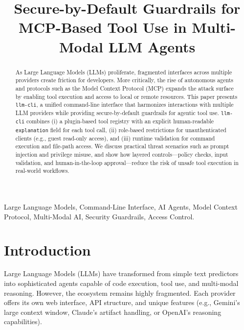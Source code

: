 \documentclass[conference]{IEEEtran}
\begin{document}
\title{Secure-by-Default Guardrails for MCP-Based Tool Use in Multi-Modal LLM Agents}

\author{
}

\maketitle

\begin{abstract}
As Large Language Models (LLMs) proliferate, fragmented interfaces across multiple providers create friction for developers. More critically, the rise of autonomous agents and protocols such as the Model Context Protocol (MCP) expands the attack surface by enabling tool execution and access to local or remote resources. This paper presents \texttt{llm-cli}, a unified command-line interface that harmonizes interactions with multiple LLM providers while providing secure-by-default guardrails for agentic tool use. \texttt{llm-cli} combines (i) a plugin-based tool registry with an explicit human-readable \texttt{explanation} field for each tool call, (ii) role-based restrictions for unauthenticated clients (e.g., guest read-only access), and (iii) runtime validation for command execution and file-path access. We discuss practical threat scenarios such as prompt injection and privilege misuse, and show how layered controls---policy checks, input validation, and human-in-the-loop approval---reduce the risk of unsafe tool execution in real-world workflows.
\end{abstract}

\begin{IEEEkeywords}
Large Language Models, Command-Line Interface, AI Agents, Model Context Protocol, Multi-Modal AI, Security Guardrails, Access Control.
\end{IEEEkeywords}

\section{Introduction}
Large Language Models (LLMs) have transformed from simple text predictors into sophisticated agents capable of code execution, tool use, and multi-modal reasoning. However, the ecosystem remains highly fragmented. Each provider offers its own web interface, API structure, and unique features (e.g., Gemini's large context window, Claude's artifact handling, or OpenAI's reasoning capabilities).
\end{document}
